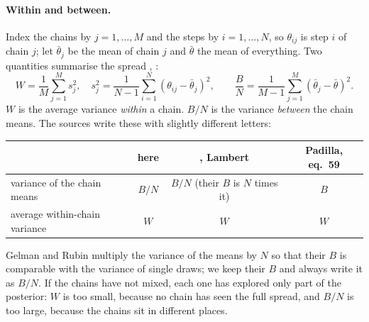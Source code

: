 \paragraph{Within and between.}
Index the chains by $j=1,\dots,M$ and the steps by $i=1,\dots,N$, so $\theta_{ij}$ is step $i$ of
chain $j$; let $\bar\theta_j$ be the mean of chain $j$ and $\bar\theta$ the mean of everything.
Two quantities summarise the spread , :
\begin{equation}
  W=\frac1M\sum_{j=1}^M s_j^2,\quad s_j^2=\frac{1}{N-1}\sum_{i=1}^N(\theta_{ij}-\bar\theta_j)^2,
  \qquad
  \frac BN=\frac{1}{M-1}\sum_{j=1}^M(\bar\theta_j-\bar\theta)^2 .
  \label{9b:eq:WB}
\end{equation}
$W$ is the average variance \emph{within} a chain. $B/N$ is the variance \emph{between} the chain
means. The sources write these with slightly different letters:
\begin{center}
\begin{tabular}{lccc}
\toprule
 & here & \textcite{GelmanRubin1992}, Lambert & Padilla, eq.~59\\
\midrule
variance of the chain means & $B/N$ & $B/N$ (their $B$ is $N$ times it) & $B$\\
average within-chain variance & $W$ & $W$ & $W$\\
\bottomrule
\end{tabular}
\end{center}
Gelman and Rubin multiply the variance of the means by $N$ so that their $B$ is comparable with
the variance of single draws; we keep their $B$ and always write it as $B/N$. If the chains have not
mixed, each one has explored only part of the posterior: $W$ is too small, because no chain has
seen the full spread, and $B/N$ is too large, because the chains sit in different places.

